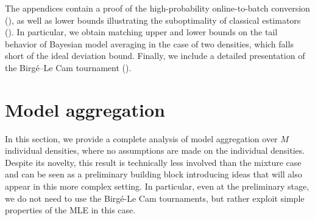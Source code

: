 \documentclass[11pt]{article}
\newcommand{\M}{M}
\theoremstyle{definition}
\theoremstyle{remark}
\begin{document}
The appendices contain a proof of the high-probability online-to-batch conversion (), as well as lower bounds illustrating the suboptimality of classical estimators (). 
In particular, we obtain matching upper and lower bounds on the tail behavior of Bayesian model averaging in the case of two densities, which falls short of the ideal deviation bound.
Finally, we include a detailed presentation of the Birg\'{e}--Le Cam tournament ().



\section{Model aggregation}\label{sec:model-agg}

In this section, we provide a complete analysis of model aggregation over $\M$ individual densities, where no assumptions are made on the individual densities.
Despite its novelty, this result is technically less involved than the mixture case and can be seen as a preliminary building block introducing ideas that will also appear in this more complex setting.
In particular, even at the preliminary stage, we do not need to use the Birg\'{e}-Le Cam tournaments, but rather exploit simple properties of the MLE in this case.
\end{document}
